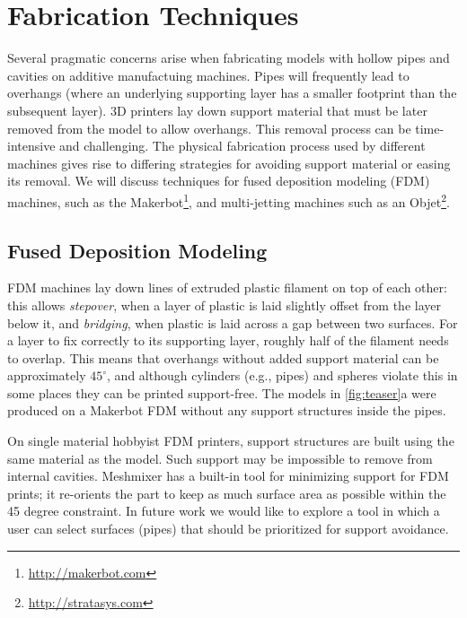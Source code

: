 \section{Fabrication Techniques}
Several pragmatic concerns arise when fabricating models with hollow pipes and cavities on additive manufactuing machines. Pipes will frequently lead to overhangs (where an underlying supporting layer has a smaller footprint than the subsequent layer).
3D printers lay down support material that must be later removed from the model to allow overhangs.  This removal process can be time-intensive and challenging.  The physical fabrication process used by different machines gives rise to differing strategies for avoiding support material or easing its removal.  We will discuss techniques for fused deposition modeling (FDM) machines, such as the Makerbot\footnote{\url{http://makerbot.com}}, and multi-jetting machines such as an Objet\footnote{\url{http://stratasys.com}}.

\subsection{Fused Deposition Modeling}
FDM machines lay down lines of extruded plastic filament on top of each other: this allows {\em stepover}, when a layer of plastic is laid slightly offset from the layer below it, and {\em bridging}, when plastic is laid across a gap between two surfaces.  For a layer to fix correctly to its supporting layer, roughly half of the filament needs to overlap.  This means that overhangs without added support material can be approximately $45^{\circ}$, and although cylinders (e.g., pipes) and spheres violate this in some places they can be printed support-free. The models in \ref{fig:teaser}a were produced on a Makerbot FDM without any support structures inside the pipes.

On single material hobbyist FDM printers, support structures are built using the same material as the model. Such support may be impossible to remove from internal cavities.  Meshmixer has a built-in tool for minimizing support for FDM prints; it re-orients the part to keep as much surface area as possible within the 45 degree constraint.  In future work we would like to explore a tool in which a user can select surfaces (pipes) that should be prioritized for support avoidance.

